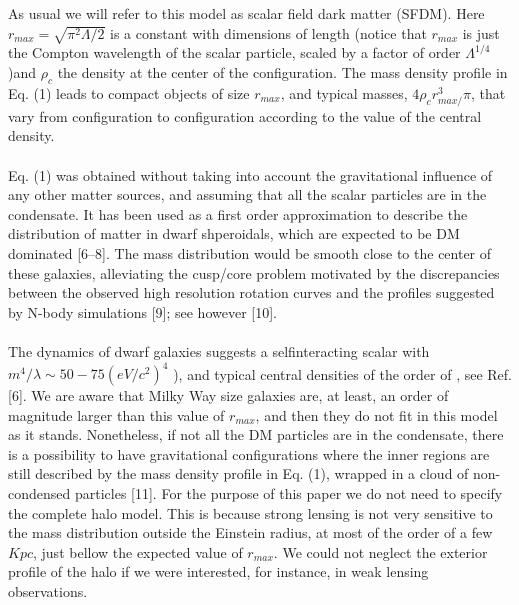\documentclass{article}
\begin{document}
\begin{multicols}{2}[]
As usual we will refer to this model as scalar field dark
matter (SFDM). Here $r_{max}=\sqrt{\pi^2\Lambda/2}$
is a constant with dimensions of length (notice that $r_{max}$ is just the Compton wavelength of the scalar particle, %
scaled by a factor of order $\Lambda^{1/4}$
)and $\rho_c$ the density at
the center of the configuration. The mass density profile
in Eq. (1) leads to compact objects of size $r_{max}$, and typical masses, $4\rho_{c}r^{3}_{max/}\pi$, that vary from configuration to
configuration according to the value of the central density.
\\\\
Eq. (1) was obtained without taking into account the
gravitational influence of any other matter sources, and
assuming that all the scalar particles are in the condensate. It has been used as a first order approximation to
describe the distribution of matter in dwarf shperoidals,
which are expected to be DM dominated [6–8]. The mass
distribution would be smooth close to the center of these
galaxies, alleviating the cusp/core problem motivated by
the discrepancies between the observed high resolution
rotation curves and the profiles suggested by N-body simulations [9]; see however [10].
\\\\
The dynamics of dwarf galaxies suggests a selfinteracting scalar with $m^4/\lambda{\sim}50-75(eV/c^2)^4$
), and typical central densities of the
order of %
, see Ref. [6]. We are aware
that Milky Way size galaxies are, at least, an order of
magnitude larger than this value of $r_{max}$, and then they
do not fit in this model as it stands. Nonetheless, if
not all the DM particles are in the condensate, there is
a possibility to have gravitational configurations where
the inner regions are still described by the mass density
profile in Eq. (1), wrapped in a cloud of non-condensed
particles [11]. For the purpose of this paper we do not
need to specify the complete halo model. This is because
strong lensing is not very sensitive to the mass distribution outside the Einstein radius, at most of the order of
a few $Kpc$, just bellow the expected value of $r_{max}$. We
could not neglect the exterior profile of the halo if we were
interested, for instance, in weak lensing observations.
\\\\
\begin{center}

\end{center}
\end{multicols}
\end{document}
